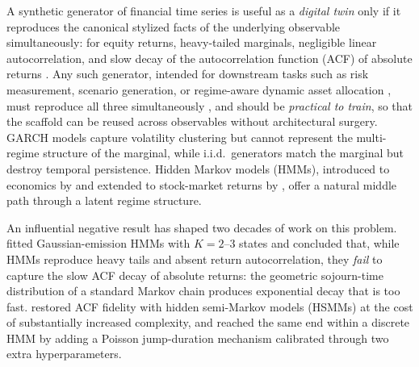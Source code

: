 A synthetic generator of financial time series is useful as a \emph{digital twin} only if it reproduces the canonical stylized facts of the underlying observable simultaneously: for equity returns, heavy-tailed marginals, negligible linear autocorrelation, and slow decay of the autocorrelation function (ACF) of absolute returns \cite{mandelbrot1963variation, cont2001empirical}.
Any such generator, intended for downstream tasks such as risk measurement, scenario generation, or regime-aware dynamic asset allocation \cite{baekimmulvey2014}, must reproduce all three simultaneously \cite{assefa2020generating, jordon2022synthetic}, and should be \emph{practical to train}, so that the scaffold can be reused across observables without architectural surgery.
GARCH models \cite{engle1982autoregressive, bollerslev1986generalized} capture volatility clustering but cannot represent the multi-regime structure of the marginal, while i.i.d.\ generators match the marginal but destroy temporal persistence.
Hidden Markov models (HMMs), introduced to economics by \citet{hamilton1989new} and extended to stock-market returns by \citet{schaller1997regime}, offer a natural middle path through a latent regime structure.

An influential negative result has shaped two decades of work on this problem.
\citet{ryden1998stylized} fitted Gaussian-emission HMMs with $K = 2$--$3$ states and concluded that, while HMMs reproduce heavy tails and absent return autocorrelation, they \emph{fail} to capture the slow ACF decay of absolute returns: the geometric sojourn-time distribution of a standard Markov chain produces exponential decay that is too fast.
\citet{bulla2006stylized} restored ACF fidelity with hidden semi-Markov models (HSMMs) at the cost of substantially increased complexity, and \citet{alswaidan2026hybrid} reached the same end within a discrete HMM by adding a Poisson jump-duration mechanism calibrated through two extra hyperparameters.

